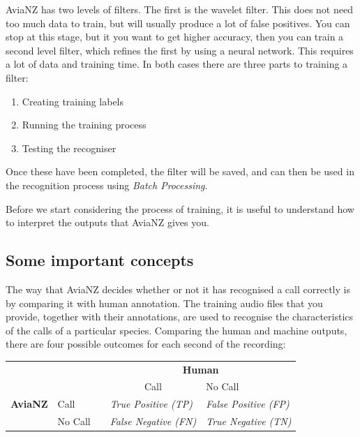 \documentclass{scrartcl}
\begin{document}
AviaNZ has two levels of filters. The first is the wavelet filter. This does not need too much data to train, but will usually produce a lot of false positives. You can stop at this stage, but it you want to get higher accuracy, then you can train a second level filter, which refines the first by using a neural network. This requires a lot of data and training time. In both cases there are three parts to training a filter:

\begin{enumerate}
\item Creating training labels
\item Running the training process
\item Testing the recogniser
\end{enumerate}

Once these have been completed, the filter will be saved, and can then be used in the recognition process using \textit{Batch Processing}.

Before we start considering the process of training, it is useful to understand how to interpret the outputs that AviaNZ gives you. 

\subsection{Some important concepts}\label{sec:metrics}

The way that AviaNZ decides whether or not it has recognised a call correctly is by comparing it with human annotation. The training audio files that you provide, together with their annotations, are used to recognise the characteristics of the calls of a particular species. Comparing the human and machine outputs, there are four possible outcomes for each second of the recording:

\begin{center}
\begin{tabular}{lllll}
&          &  & \multicolumn{2}{c}{\textbf{Human}}   \\
\cmidrule(lr){4-5}
             &          &  & \multicolumn{1}{c}{Call}                                               & No Call                                                               \\
 \textbf{AviaNZ}                  &\vline \hspace{0.25cm}Call     &  & \textit{True Positive (TP)}  & \textit{False Positive (FP)} \\
                  &\vline \hspace{0.25cm}No Call &  & \textit{False Negative (FN)} & \textit{True Negative (TN)}  \\
\end{tabular}
\end{center}
\end{document}
